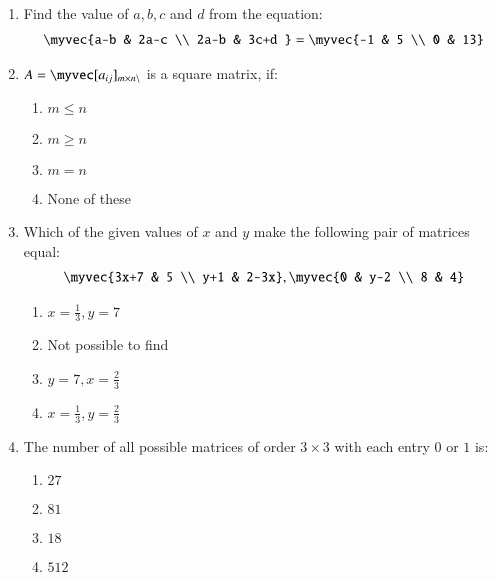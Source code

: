 \documentclass{article}
\theoremstyle{remark}
\begin{document}
\begin{enumerate}
\item Find the value of $a, b, c$ and $d$ from the equation:
\begin{align} \myvec 
{a-b & 2a-c \\ 2a-b &  3c+d } = 
\myvec{-1 & 5 \\ 0 & 13} \end{align}
\item $A=\myvec  [a_{ij}]_{m\times n\setminus}$ is a square matrix, if:
\begin{enumerate}
\item $m \le n$
\item $m \ge n$
\item $m=n$
\item None of these
\end{enumerate}
\item Which of the given values of $x$ and $y$ make the following pair of matrices equal:
\begin{align} \myvec
{3x+7 & 5 \\ y+1 & 2-3x}, 
\myvec{0 & y-2 \\ 8 & 4}\end{align}
\begin{enumerate}
\item $x=, y=7$
\item Not possible to find 
\item $y=7, x=$
\item $x=, y=$
\end{enumerate}
\item The number of all possible matrices of order $3$ with each entry $0$ or $1$ is:
\begin{enumerate}
\item $27$
\item $81$
\item $18$
\item $512$
\end{enumerate}
\end{enumerate}
\end{document}
